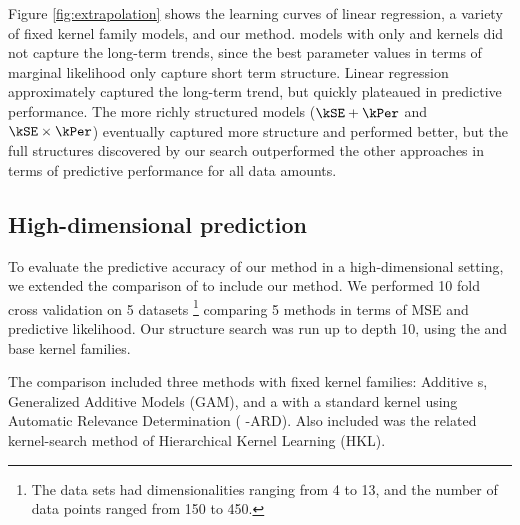 Figure \ref{fig:extrapolation} shows the learning curves of linear regression, a variety of fixed kernel family \gp{} models, and our method.  
\gp{} models with only \kSE{} and \kPer{} kernels did not capture the long-term trends, since the best parameter values in terms of \gp{} marginal likelihood only capture short term structure. 
Linear regression approximately captured the long-term trend, but quickly plateaued in predictive performance.
The more richly structured \gp{} models (${\kSE + \kPer}$ and ${\kSE \times \kPer}$) eventually captured more structure and performed better, but the full structures discovered by our search outperformed the other approaches in terms of predictive performance for all data amounts.

\footnotetext{
In one dimension, the predictive means of all baseline methods in table \ref{tbl:Regression Mean Squared Error} are identical to that of a \gp{} with an $\kSE{}$ kernel.}


\subsection{High-dimensional prediction}

To evaluate the predictive accuracy of our method in a high-dimensional setting, we extended the comparison of \cite{duvenaud2011additive11} to include our method.
We performed 10 fold cross validation on 5 datasets
\footnote{The data sets had dimensionalities ranging from 4 to 13, and the number of data points ranged from 150 to 450.} comparing 5 methods in terms of MSE and predictive likelihood.
Our structure search was run up to depth 10, using the \SE{} and \RQ{} base kernel families.

The comparison included three methods with fixed kernel families: Additive \gp{}s, Generalized Additive Models (GAM), and a \gp{} with a standard \kSE{} kernel using Automatic Relevance Determination (\gp{} \kSE{}-ARD).  Also included was the related kernel-search method of Hierarchical Kernel Learning (HKL).

